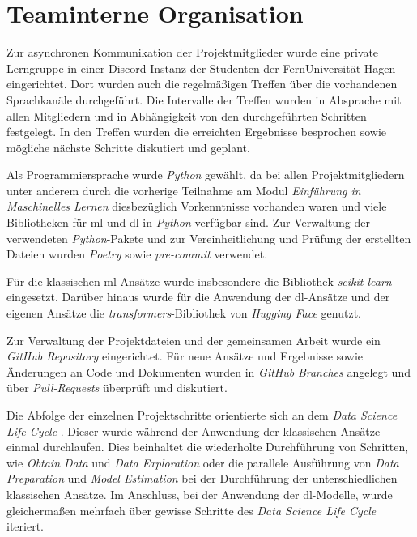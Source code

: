 \section{Teaminterne Organisation}\label{sec:teaminterneorganisation}

Zur asynchronen Kommunikation der Projektmitglieder wurde eine private Lerngruppe in einer Discord-Instanz der Studenten der FernUniversität Hagen eingerichtet.
Dort wurden auch die regelmäßigen Treffen über die vorhandenen Sprachkanäle durchgeführt.
Die Intervalle der Treffen wurden in Absprache mit allen Mitgliedern und in Abhängigkeit von den durchgeführten Schritten festgelegt.
In den Treffen wurden die erreichten Ergebnisse besprochen sowie mögliche nächste Schritte diskutiert und geplant.

Als Programmiersprache wurde \textit{Python} gewählt, da bei allen Projektmitgliedern unter anderem durch die vorherige Teilnahme am Modul \textit{Einführung in Maschinelles Lernen} diesbezüglich Vorkenntnisse vorhanden waren und viele Bibliotheken für \gls{ml} und \gls{dl} in \textit{Python} verfügbar sind.
Zur Verwaltung der verwendeten \textit{Python}-Pakete und zur Vereinheitlichung und Prüfung der erstellten Dateien wurden \textit{Poetry} \cite{poetry2025} sowie \textit{pre-commit} \cite{precommit2025} verwendet.

Für die klassischen \gls{ml}-Ansätze wurde insbesondere die Bibliothek \textit{scikit-learn} eingesetzt.
Darüber hinaus wurde für die Anwendung der \gls{dl}-Ansätze und der eigenen Ansätze die \textit{transformers}-Bibliothek von \textit{Hugging Face} genutzt.

Zur Verwaltung der Projektdateien und der gemeinsamen Arbeit wurde ein \textit{GitHub Repository} \cite{githubrepo2025} eingerichtet.
Für neue Ansätze und Ergebnisse sowie Änderungen an Code und Dokumenten wurden in \textit{GitHub} \textit{Branches} angelegt und über \textit{Pull-Requests} überprüft und diskutiert.

Die Abfolge der einzelnen Projektschritte orientierte sich an dem \textit{Data Science Life Cycle} \cite[Abb. 2]{Stodden2020}.
Dieser wurde während der Anwendung der klassischen Ansätze einmal durchlaufen.
Dies beinhaltet die wiederholte Durchführung von Schritten, wie \textit{Obtain Data} und \textit{Data Exploration} oder die parallele Ausführung von \textit{Data Preparation} und \textit{Model Estimation} bei der Durchführung der unterschiedlichen klassischen Ansätze.
Im Anschluss, bei der Anwendung der \gls{dl}-Modelle, wurde gleichermaßen mehrfach über gewisse Schritte des \textit{Data Science Life Cycle} iteriert.
